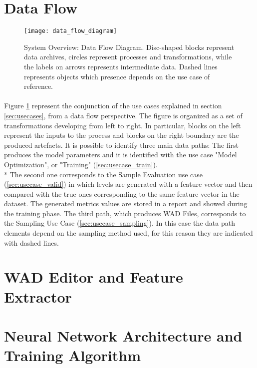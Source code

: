 \section{Data Flow}
\label{sec:dataflow}
\begin{figure}[h!]
	\begin{center}
		\texttt{[image: data\_flow\_diagram]}
	\end{center}
	
	\captionsetup{width=\linewidth}
	\caption[System Overview: Data Flow Diagram]{System Overview: Data Flow Diagram. Disc-shaped blocks represent data archives, circles represent processes and transformations, while the labels on arrows represents intermediate data. Dashed lines represents objects which presence depends on the use case of reference.}
	\label{fig:dataflow}
\end{figure}

\paragraph{} Figure \ref{fig:dataflow} represent the conjunction of the use cases explained in section \ref{sec:usecases}, from a data flow perspective.  The figure is organized as a set of transformations developing from left to right. In particular, blocks on the left represent the inputs to the process and blocks on the right boundary are the produced artefacts. 
It is possible to identify three main data paths: The first produces the model parameters and it is identified with the use case "Model Optimization", or "Training" (\ref{sec:usecase_train}). \\* The second one corresponds to the Sample Evaluation use case (\ref{sec:usecase_valid}) in which levels are generated with a feature vector and then compared with the true ones corresponding to the same feature vector in the dataset. The generated metrics values are stored in a report and showed during the training phase.
The third path, which produces WAD Files, corresponds to the Sampling Use Case (\ref{sec:usecase_sampling}). In this case the data path elements depend on the sampling method used, for this reason they are indicated with dashed lines.

\newpage
\section{WAD Editor and Feature Extractor}

\section{Neural Network Architecture and Training Algorithm}
\label{sec:nn}
